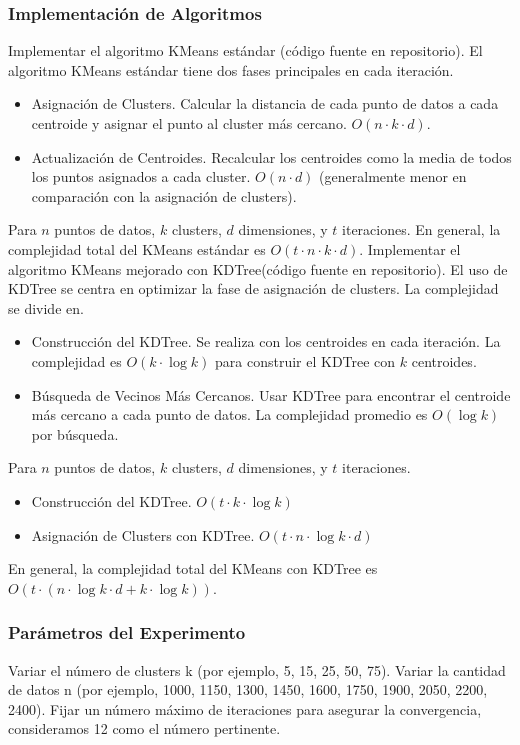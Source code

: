\documentclass[conference]{IEEEtran}
\begin{document}
\subsubsection{Implementación de Algoritmos}
Implementar el algoritmo KMeans estándar (código fuente en repositorio). 
El algoritmo KMeans estándar tiene dos fases principales en cada iteración.
\begin{itemize}
\item{Asignación de Clusters.} Calcular la distancia de cada punto de datos a cada centroide y asignar el punto al cluster más cercano. \(O(n \cdot k \cdot d)\).
\item{Actualización de Centroides.} Recalcular los centroides como la media de todos los puntos asignados a cada cluster. \(O(n \cdot d)\) (generalmente menor en comparación con la asignación de clusters).
\end{itemize}
Para \(n\) puntos de datos, \(k\) clusters, \(d\) dimensiones, y \(t\) iteraciones.
En general, la complejidad total del KMeans estándar es \(O(t \cdot n \cdot k \cdot d)\).
Implementar el algoritmo KMeans mejorado con KDTree(código fuente en repositorio).
El uso de KDTree se centra en optimizar la fase de asignación de clusters. La complejidad se divide en.
\begin{itemize}
    \item{Construcción del KDTree.} Se realiza con los centroides en cada iteración. La complejidad es \(O(k \cdot \log k)\) para construir el KDTree con \(k\) centroides.
    \item{Búsqueda de Vecinos Más Cercanos.} Usar KDTree para encontrar el centroide más cercano a cada punto de datos. La complejidad promedio es \(O(\log k)\) por búsqueda.
\end{itemize}
Para \(n\) puntos de datos, \(k\) clusters, \(d\) dimensiones, y \(t\) iteraciones.
\begin{itemize}
    \item{Construcción del KDTree.} \(O(t \cdot k \cdot \log k)\)
    \item{Asignación de Clusters con KDTree.} \(O(t \cdot n \cdot \log k \cdot d)\)
\end{itemize}

En general, la complejidad total del KMeans con KDTree es \(O(t \cdot (n \cdot \log k \cdot d + k \cdot \log k))\).
\subsubsection{Parámetros del Experimento}
Variar el número de clusters k (por ejemplo, 5, 15, 25, 50, 75).
Variar la cantidad de datos n (por ejemplo, 1000, 1150, 1300, 1450, 1600, 1750, 1900, 2050, 2200, 2400).
Fijar un número máximo de iteraciones para asegurar la convergencia, consideramos 12 como el número pertinente.
\end{document}
